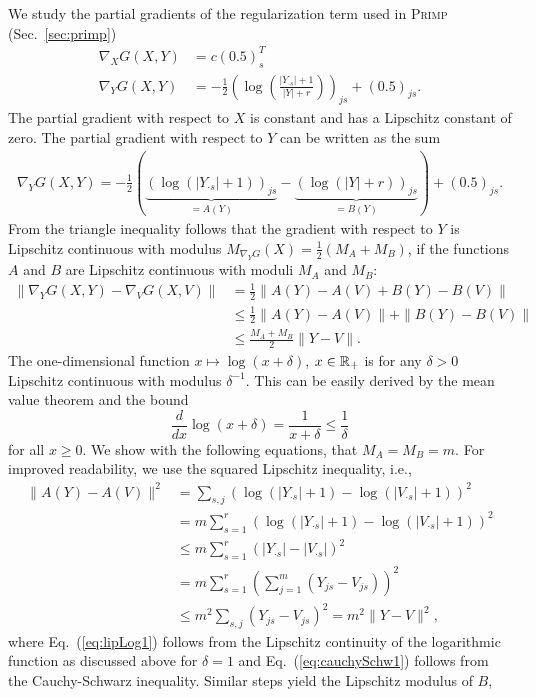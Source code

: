 We study the partial gradients of the regularization term used in \textsc{Primp} (Sec.~\ref{sec:primp})
\begin{align*}
\nabla_X G(X,Y)&=c(0.5)_s^T\\
\nabla_Y G(X,Y)&=-\frac{1}{2}\left(\log\left(\frac{|Y_{\cdot s}|+1}{|Y|+r}\right)\right)_{js}+(0.5)_{js}.
\end{align*}
The partial gradient with respect to $X$ is constant and has a Lipschitz constant of zero. The partial gradient with respect to $Y$ can be written as the sum
\begin{align*}
\nabla_YG(X,Y)=-\frac{1}{2}(\underbrace{(\log(|Y_{\cdot s}|+1))_{js}}_{=A(Y)}-\underbrace{(\log(|Y|+r))_{js}}_{=B(Y)})+(0.5)_{js}.
\end{align*}
From the triangle inequality follows that the gradient with respect to $Y$ is Lipschitz continuous with modulus $M_{\nabla_YG}(X)=\frac{1}{2}(M_A+M_B)$, if the functions $A$ and $B$ are Lipschitz continuous with moduli $M_A$ and $M_B$:
\begin{align*}
\|\nabla_YG(X,Y)-\nabla_VG(X,V)\|&=\frac{1}{2}\|A(Y)-A(V)+B(Y)-B(V)\|\\
&\leq \frac{1}{2}\|A(Y)-A(V)\|+\|B(Y)-B(V)\|\\
&\leq \frac{M_A+M_B}{2}\|Y-V\|.
\end{align*}
The one-dimensional function $x\mapsto\log(x+\delta)$, $x\in \mathbb{R}_+$ is for any $\delta>0$ Lipschitz continuous with modulus $\delta^{-1}$. This can be easily derived by the mean value theorem and the bound 
\[\frac{d}{dx}\log(x+\delta)=\frac{1}{x+\delta}\leq \frac{1}{\delta}\]
for all $x\geq 0$. We show with the following equations, that $M_A=M_B=m$. For improved readability, we use the squared Lipschitz inequality, i.e.,
\begin{align}
\|A(Y)-A(V)\|^2 &=\sum_{s,j}(\log(|Y_{\cdot s}|+1)-\log(|V_{\cdot s}|+1))^2\nonumber\\
&=m\sum_{s=1}^r(\log(|Y_{\cdot s}|+1)-\log(|V_{\cdot s}|+1))^2\nonumber \\
&\leq m\sum_{s=1}^r(|Y_{\cdot s}|-|V_{\cdot s}|)^2\label{eq:lipLog1}\\
&= m\sum_{s=1}^r\left(\sum_{j=1}^m(Y_{j s}-V_{j s})\right)^2\nonumber\\
&\leq m^2\sum_{s,j}(Y_{j s}-V_{j s})^2= m^2\|Y-V\|^2,\label{eq:cauchySchw1}
\end{align}
where Eq.~(\ref{eq:lipLog1}) follows from the Lipschitz continuity of the logarithmic function as discussed above for $\delta=1$ and Eq.~(\ref{eq:cauchySchw1}) follows from the Cauchy-Schwarz inequality. Similar steps yield the Lipschitz modulus of $B$,
